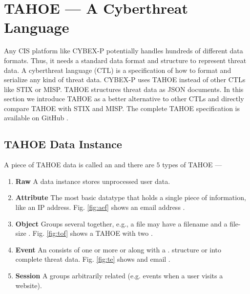 
\section{TAHOE --- A Cyberthreat Language}\label{sec:tahoe}

Any CIS platform like CYBEX-P potentially handles hundreds of different data formats. Thus, it needs a standard data format and structure to represent threat data. A cyberthreat language (CTL) is a specification of how to format and serialize any kind of threat data. CYBEX-P uses TAHOE instead of other CTLs like STIX\cite{barnum2012standardizing} or MISP\cite{dulaunoy-misp-core-format-13}. TAHOE structures threat data as JSON \cite{bray2014javascript} documents. In this section we introduce TAHOE as a better alternative to other CTLs and directly compare TAHOE with STIX and MISP. The complete TAHOE specification is available on GitHub \cite{sadique2021tahoe}.



\subsection{TAHOE Data Instance}\label{ss:instance}

A piece of TAHOE data is called an  and there are $5$ types of TAHOE  ---
\begin{enumerate}
    \item \textbf{Raw} A  data instance stores unprocessed user data.
    \item \textbf{Attribute} The most basic datatype that holds a single piece of information, like an IP address. Fig. \ref{fig:aef} shows an email address .
    \item \textbf{Object} Groups several  together, e.g., a file  may have a filename and a file-size . Fig. \ref{fig:tof} shows a TAHOE  with two .
    \item \textbf{Event} An  consists of one or more  or  along with a .  structure  or  into complete threat data. Fig. \ref{fig:te} shows and email .
    \item \textbf{Session} A  groups arbitrarily related  (e.g. events when a user visits a website).
\end{enumerate}



